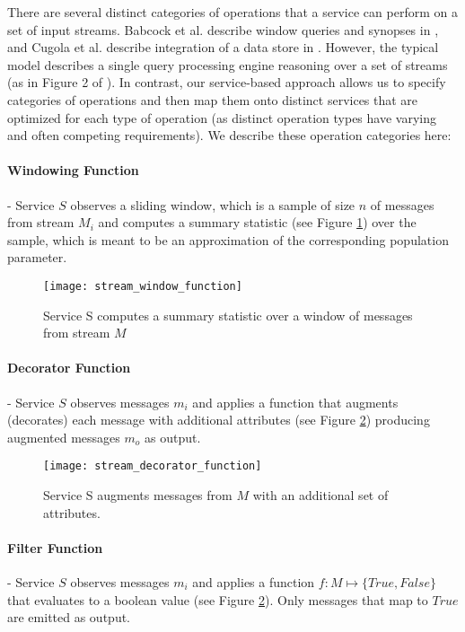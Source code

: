 There are several distinct categories of operations that a service can perform on a set of input streams. Babcock et al. describe window queries and synopses in \autocite{babcock2002models}, and Cugola et al. describe integration of a data store in \autocite{cugola2012processing}. However, the typical model describes a single query processing engine reasoning over a set of streams (as in Figure 2 of \autocite{cugola2012processing}). In contrast, our service-based approach allows us to specify categories of operations and then map them onto distinct services that are optimized for each type of operation (as distinct operation types have varying and often competing requirements). We describe these operation categories here:

\paragraph{Windowing Function} - Service $S$ observes a sliding window, which is a sample of size $n$ of messages from stream $M_i$ and computes a summary statistic (see Figure \ref{fig:stream_window_function}) over the sample, which is meant to be an approximation of the corresponding population parameter.

\begin{figure}[H]
\texttt{[image: stream\_window\_function]}
\centering
\caption {Service S computes a summary statistic over a window of messages from stream $M$}
\label{fig:stream_window_function}
\end{figure}
\newpage 
\paragraph{Decorator Function} - Service $S$ observes messages $m_i$ and applies a function that augments (decorates) each message with additional attributes (see Figure \ref{fig:stream_decorator_function}) producing augmented messages $m_o$ as output.

\begin{figure}[H]
\texttt{[image: stream\_decorator\_function]}
\centering
\caption {Service S augments messages from $M$ with an additional set of attributes.}
\label{fig:stream_decorator_function}
\end{figure}

\paragraph{Filter Function} - Service $S$ observes messages $m_i$ and applies a function $f:M\mapsto\{True,False\}$ that evaluates to a boolean value (see Figure \ref{fig:stream_decorator_function}). Only messages that map to $True$ are emitted as output.

